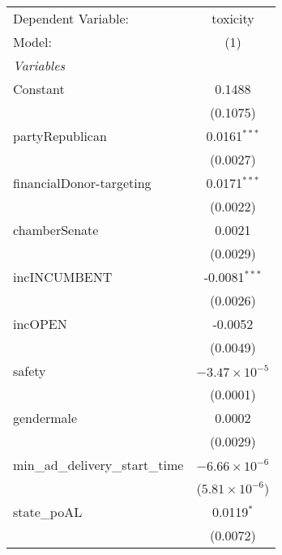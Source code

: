 \begingroup
\centering
\begin{tabular}{lc}
   \tabularnewline \midrule \midrule
   Dependent Variable:                                & toxicity\\  
   Model:                                             & (1)\\  
   \midrule
   \emph{Variables}\\
   Constant                                           & 0.1488\\   
                                                      & (0.1075)\\   
   partyRepublican                                    & 0.0161$^{***}$\\   
                                                      & (0.0027)\\   
   financialDonor-targeting                           & 0.0171$^{***}$\\   
                                                      & (0.0022)\\   
   chamberSenate                                      & 0.0021\\   
                                                      & (0.0029)\\   
   incINCUMBENT                                       & -0.0081$^{***}$\\   
                                                      & (0.0026)\\   
   incOPEN                                            & -0.0052\\   
                                                      & (0.0049)\\   
   safety                                             & $-3.47\times 10^{-5}$\\    
                                                      & (0.0001)\\   
   gendermale                                         & 0.0002\\   
                                                      & (0.0029)\\   
   min\_ad\_delivery\_start\_time                     & $-6.66\times 10^{-6}$\\    
                                                      & ($5.81\times 10^{-6}$)\\    
   state\_poAL                                        & 0.0119$^{*}$\\   
                                                      & (0.0072)\\   

\end{tabular}
